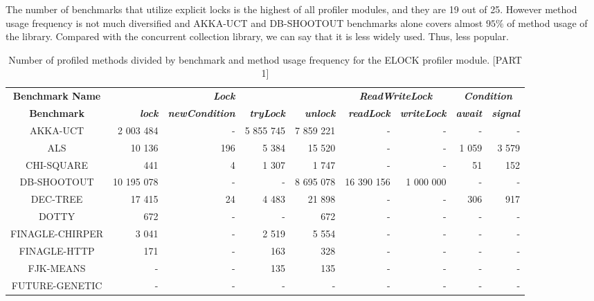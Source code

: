 \documentclass[]{usiinfthesis}
\begin{document}
 The number of benchmarks that utilize explicit locks is the highest of all profiler modules, and they are 19 out of 25. However method usage frequency is not much diversified and AKKA-UCT and DB-SHOOTOUT benchmarks alone covers almost \(95\%\) of method usage of the library. Compared with the concurrent collection library, we can say that it is less widely used. Thus, less popular.
 
 \begin{table}
\centering
\caption[Method Usage Frequencies for ELOCK pt.1]{Number of profiled methods divided by benchmark and method usage frequency for the ELOCK profiler module. [PART 1]}
\label{tab:6}
\begin{tabular}{|c|r|r|r|r|r|r|r|r|}
\hline
\textbf{ 	 Benchmark Name 	 } & \multicolumn{4}{c|}{\textbf{\textit{Lock}}} & \multicolumn{2}{c|}{\textbf{\textit{ReadWriteLock}}} & \multicolumn{2}{c|}{\textbf{\textit{Condition}}} \\ 
 \textbf{ 	 Benchmark 	 }&\textbf{\textit{ 	lock	 }}&\textbf{\textit{ 	newCondition	 }}&\textbf{\textit{ 	tryLock	 }}&\textbf{\textit{ 	unlock	 }}&\textbf{\textit{ 	readLock	 }}&\textbf{\textit{ 	writeLock	 }}&\textbf{\textit{ 	await	 }}&\textbf{\textit{ 	signal	 }}\\\hline 
	AKKA-UCT	&	 2 003 484 	 & 	 -   	 & 	 5 855 745 	 & 	 7 859 221 	 & 	 -   	 & 	 -   	 & 	 -   	 & 	 -   	 \\ 
	ALS	&	 10 136 	 & 	 196 	 & 	 5 384 	 & 	 15 520 	 & 	 -   	 & 	 -   	 & 	 1 059 	 & 	 3 579 	 \\ 
	CHI-SQUARE	&	 441 	 & 	 4 	 & 	 1 307 	 & 	 1 747 	 & 	 -   	 & 	 -   	 & 	 51 	 & 	 152 	 \\ 
	DB-SHOOTOUT	&	 10 195 078 	 & 	 -   	 & 	 -   	 & 	 8 695 078 	 & 	 16 390 156 	 & 	 1 000 000 	 & 	 -   	 & 	 -   	 \\ 
	DEC-TREE	&	 17 415 	 & 	 24 	 & 	 4 483 	 & 	 21 898 	 & 	 -   	 & 	 -   	 & 	 306 	 & 	 917 	 \\ 
	DOTTY	&	 672 	 & 	 -   	 & 	 -   	 & 	 672 	 & 	 -   	 & 	 -   	 & 	 -   	 & 	 -   	 \\ 
	FINAGLE-CHIRPER	&	 3 041 	 & 	 -   	 & 	 2 519 	 & 	 5 554 	 & 	 -   	 & 	 -   	 & 	 -   	 & 	 -   	 \\ 
	FINAGLE-HTTP	&	 171 	 & 	 -   	 & 	 163 	 & 	 328 	 & 	 -   	 & 	 -   	 & 	 -   	 & 	 -   	 \\ 
	FJK-MEANS	&	 -   	 & 	 -   	 & 	 135 	 & 	 135 	 & 	 -   	 & 	 -   	 & 	 -   	 & 	 -   	 \\ 
	FUTURE-GENETIC	&	 -   	 & 	 -   	 & 	 -   	 & 	 -   	 & 	 -   	 & 	 -   	 & 	 -   	 & 	 -   	 \\ 

\end{tabular}
\end{table}
\end{document}
